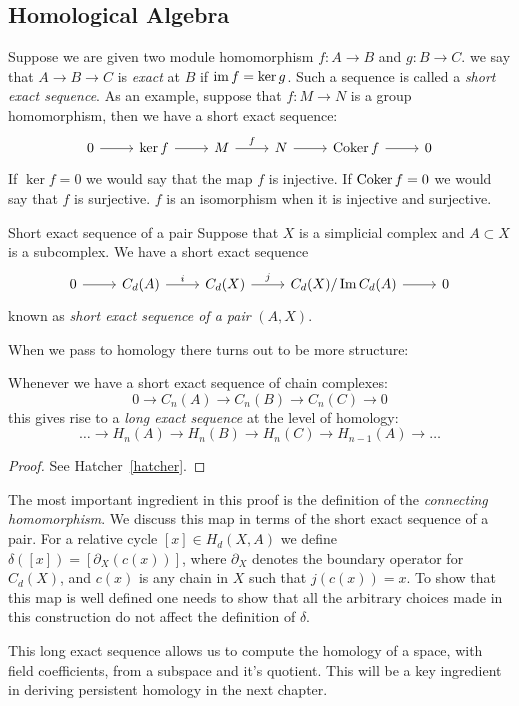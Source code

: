 \subsection{Homological Algebra} 
Suppose we are given two module homomorphism $f: A \rightarrow B$ and $g: B \rightarrow C$. we say that $A \rightarrow B \rightarrow C$
is \emph{exact} at $B$ if $\operatorname{im}{f} =  \ker{g}$. Such a sequence is called a \emph{short exact sequence}. As an example, suppose that $f: M \rightarrow N$ is a group homomorphism, then we have a short exact sequence:
\[ 
\begin{tikzcd}
0 \arrow{r} & \ker{f} \arrow{r} & M \arrow{r}{f} & N \arrow{r} & \coker{f} \arrow{r}& 0
\end{tikzcd}
\] 
If $\ker{f} = 0$ we would say that the map $f$ is injective. If $\operatorname{Coker}{f} = 0$ we would say that $f$ is surjective. $f$ is an isomorphism when it is injective and surjective. 
\begin{definition}{Short exact sequence of a pair}
Suppose that $X$ is a simplicial complex and $A \subset X$ is a subcomplex. We have a short exact sequence 
\[
\begin{tikzcd}
0 \arrow{r}& C_d(A) \arrow{r}{i} & C_d(X) \arrow{r}{j} & C_d(X)/\Im{C_d(A)} \arrow{r} & 0 
\end{tikzcd}
\]
known as \emph{short exact sequence of a pair} $(A,X)$.
\end{definition}
When we pass to homology there turns out to be more structure:
\begin{theorem} 
Whenever we have a short exact sequence of chain complexes: 
\[  0 \rightarrow C_n(A) \rightarrow C_n(B) \rightarrow C_n(C) \rightarrow 0 \]
this gives rise to a \emph{long exact sequence} at the level of homology:
\[ \ldots \rightarrow H_n(A) \rightarrow H_n(B) \rightarrow H_n(C) \rightarrow H_{n-1}(A) \rightarrow \ldots  \]  
\end{theorem}
\begin{proof}
See Hatcher~\ref{hatcher}.
\end{proof}
The most important ingredient in this proof is the definition of the \emph{connecting homomorphism}. We discuss this map in terms of the short exact sequence of a pair. For a relative cycle $[x] \in H_d(X,A)$ we define $\delta([x]) = [\partial_X(c(x))]$, where $\partial_X$ denotes the boundary operator for $C_d(X)$, and $c(x)$ is any chain in $X$ such that $j(c(x)) = x$. To show that this map is well defined one needs to show that all the arbitrary choices made in this construction do not affect the definition of $\delta$. 
 
This long exact sequence allows us to compute the homology of a space, with field coefficients, from a subspace and it's quotient. This will be a key ingredient in deriving persistent homology in the next chapter.